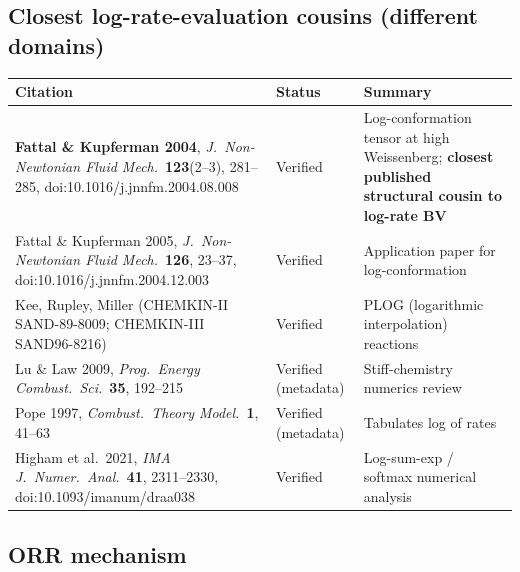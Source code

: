 \documentclass[11pt]{article}
\begin{document}
\subsection{Closest log-rate-evaluation cousins (different domains)}

\begingroup
\small
\setlength{\tabcolsep}{4pt}
\renewcommand{\arraystretch}{1.2}
\begin{longtable}{@{}p{} p{} p{}@{}}
\toprule
\textbf{Citation} & \textbf{Status} & \textbf{Summary} \\
\midrule
\endhead
\textbf{Fattal \& Kupferman 2004}, \emph{J.~Non-Newtonian Fluid Mech.}\
\textbf{123}(2--3), 281--285, doi:10.1016/j.jnnfm.2004.08.008 &
Verified &
Log-conformation tensor at high Weissenberg; \textbf{closest published
structural cousin to log-rate BV} \\
Fattal \& Kupferman 2005, \emph{J.~Non-Newtonian Fluid Mech.}\ \textbf{126},
23--37, doi:10.1016/j.jnnfm.2004.12.003 &
Verified &
Application paper for log-conformation \\
Kee, Rupley, Miller (CHEMKIN-II SAND-89-8009; CHEMKIN-III SAND96-8216) &
Verified &
PLOG (logarithmic interpolation) reactions \\
Lu \& Law 2009, \emph{Prog.~Energy Combust.~Sci.}\ \textbf{35}, 192--215 &
Verified (metadata) &
Stiff-chemistry numerics review \\
Pope 1997, \emph{Combust.~Theory Model.}\ \textbf{1}, 41--63 &
Verified (metadata) &
Tabulates log of rates \\
Higham et al.\ 2021, \emph{IMA J.~Numer.~Anal.}\ \textbf{41}, 2311--2330,
doi:10.1093/imanum/draa038 &
Verified &
Log-sum-exp / softmax numerical analysis \\
\bottomrule
\end{longtable}
\endgroup

\subsection{ORR mechanism}
\end{document}
